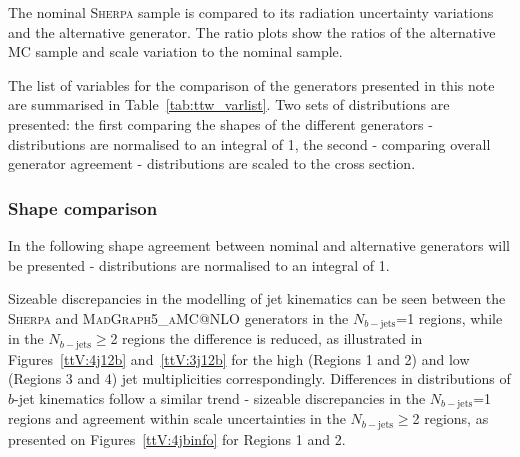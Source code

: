 The nominal  \textsc{Sherpa} \ttW  sample is compared to its radiation uncertainty variations and the alternative generator.
The ratio plots show the ratios of the alternative MC sample and scale variation to the nominal sample.

The list of variables for the comparison of the \ttW generators presented in this note are summarised in Table~\ref{tab:ttw_varlist}.
Two sets of distributions are presented: the first comparing the shapes of the different generators - distributions are normalised to an integral of 1, the second - comparing overall generator agreement - distributions are scaled to the cross section. %

\subsubsection{Shape comparison}
\label{sec:ttw_shape}
In the following shape agreement between nominal and alternative generators will be presented - distributions are normalised to an integral of 1.

Sizeable discrepancies in the modelling of jet kinematics can be seen between the \textsc{Sherpa} \ttW and \textsc{MadGraph5\_aMC@NLO} generators in the $N_{b-\mathrm{jets}}$=1 regions, while in the $N_{b-\mathrm{jets}}\geq$2 regions the difference is reduced, as illustrated in Figures~\ref{ttV:4j12b} and~\ref{ttV:3j12b} for the high (Regions 1 and 2) and low (Regions 3 and 4) jet multiplicities correspondingly. 
Differences in distributions of $b$-jet kinematics follow a similar trend - sizeable discrepancies in the $N_{b-\mathrm{jets}}$=1 regions and agreement within scale uncertainties in the $N_{b-\mathrm{jets}}\geq$2 regions, as presented on Figures~\ref{ttV:4jbinfo} for Regions 1 and 2.


